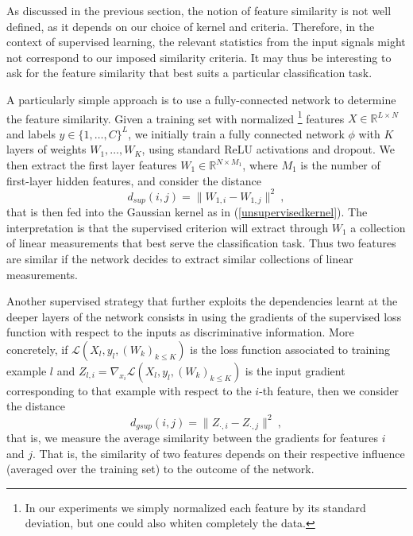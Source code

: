 \documentclass{article} %
\begin{document}
As discussed in the previous section, the notion of feature similarity is not well defined, as it depends on our choice of 
kernel and criteria. Therefore, in the context of supervised learning, the relevant statistics from the input signals might not correspond to 
our imposed similarity criteria. It may thus be interesting to ask for the feature similarity that best suits a particular classification task. 

A particularly simple approach is to use a fully-connected network to determine the feature similarity. Given a training set with normalized \footnote{In our experiments we simply normalized each feature by its standard deviation, but one could also whiten completely the data.} features $X \in \mathbb{R}^{L \times N}$ 
and labels $y \in \{1,\dots,C\}^L$, we initially train a fully connected network $\phi$ with $K$ layers of weights $W_1, \dots, W_K$, using standard ReLU activations and dropout. We then extract the first layer features $W_1 \in \mathbb{R}^{N \times M_1}$, where $M_1$ is the number of first-layer hidden features, and consider the distance
\begin{equation}
\label{supervisedkernel}
d_{sup}(i, j) = \| W_{1,i} - W_{1,j} \|^2~,
\end{equation}
that is then fed into the Gaussian kernel as in (\ref{unsupervisedkernel}). The interpretation is that the supervised criterion will extract through $W_1$ a collection of linear measurements that best serve the classification task. Thus two features are similar if the network decides to extract similar collections of linear measurements.  

Another supervised strategy that further exploits the dependencies learnt at the deeper layers of the network consists in using the gradients of the supervised loss function with respect to the inputs as discriminative information. More concretely, if $\mathcal{L}(X_l, y_l, (W_k)_{k \leq K})$ is the loss function associated to training example $l$ and $Z_{l,i} = \nabla_{x_i} \mathcal{L}(X_l, y_l, (W_k)_{k \leq K})$ is the input gradient corresponding to that example with respect to the $i$-th feature, then we consider the distance 
\begin{equation}
\label{supervisedkernel2}
d_{gsup}(i, j) = \| Z_{\cdot, i} - Z_{\cdot, j} \|^2~,
\end{equation}
that is, we measure the average similarity between the gradients for features $i$ and $j$. That is, the similarity of two features depends on their respective influence (averaged over the training set) to the outcome of the network. 
\end{document}
